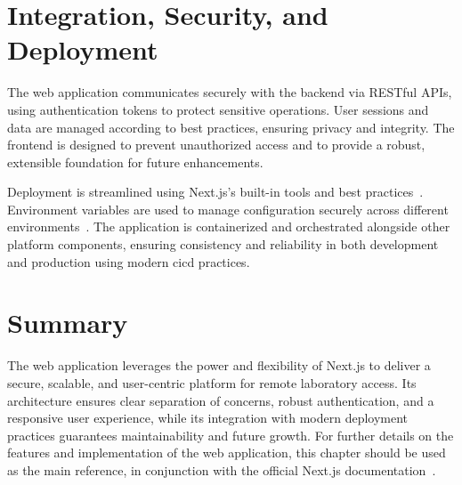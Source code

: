 \section{Integration, Security, and Deployment}

The web application communicates securely with the backend via RESTful APIs, using authentication tokens to protect sensitive operations. User sessions and data are managed according to best practices, ensuring privacy and integrity. The frontend is designed to prevent unauthorized access and to provide a robust, extensible foundation for future enhancements.

Deployment is streamlined using Next.js's built-in tools and best practices~\cite{nextjs-deployment}. Environment variables are used to manage configuration securely across different environments~\cite{nextjs-env-vars}. The application is containerized and orchestrated alongside other platform components, ensuring consistency and reliability in both development and production using modern \ac{cicd} practices.

\section{Summary}

The web application leverages the power and flexibility of Next.js to deliver a secure, scalable, and user-centric platform for remote laboratory access. Its architecture ensures clear separation of concerns, robust authentication, and a responsive user experience, while its integration with modern deployment practices guarantees maintainability and future growth. For further details on the features and implementation of the web application, this chapter should be used as the main reference, in conjunction with the official Next.js documentation~\cite{nextjs-docs}. 